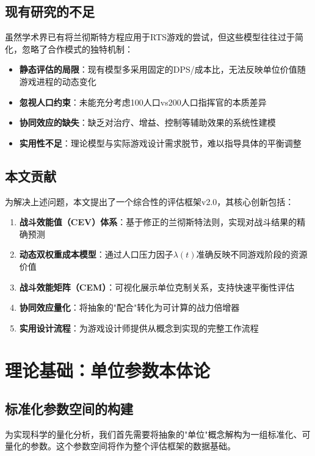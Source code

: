 \documentclass[a4paper,12pt]{article}
\begin{document}
\subsection{现有研究的不足}
虽然学术界已有将兰彻斯特方程\cite{lanchester1916}应用于RTS游戏的尝试\cite{uriarte2016}，但这些模型往往过于简化，忽略了合作模式的独特机制：

\begin{itemize}
\item \textbf{静态评估的局限}：现有模型多采用固定的DPS/成本比，无法反映单位价值随游戏进程的动态变化
\item \textbf{忽视人口约束}：未能充分考虑100人口vs200人口指挥官的本质差异
\item \textbf{协同效应的缺失}：缺乏对治疗、增益、控制等辅助效果的系统性建模
\item \textbf{实用性不足}：理论模型与实际游戏设计需求脱节，难以指导具体的平衡调整
\end{itemize}

\subsection{本文贡献}
为解决上述问题，本文提出了一个综合性的评估框架v2.0，其核心创新包括：

\begin{enumerate}
\item \textbf{战斗效能值（CEV）体系}：基于修正的兰彻斯特法则，实现对战斗结果的精确预测
\item \textbf{动态双权重成本模型}：通过人口压力因子$\lambda(t)$准确反映不同游戏阶段的资源价值
\item \textbf{战斗效能矩阵（CEM）}：可视化展示单位克制关系，支持快速平衡性评估
\item \textbf{协同效应量化}：将抽象的"配合"转化为可计算的战力倍增器
\item \textbf{实用设计流程}：为游戏设计师提供从概念到实现的完整工作流程
\end{enumerate}

\section{理论基础：单位参数本体论}

\subsection{标准化参数空间的构建}
为实现科学的量化分析，我们首先需要将抽象的"单位"概念解构为一组标准化、可量化的参数。这个参数空间将作为整个评估框架的数据基础。
\end{document}
